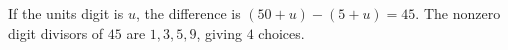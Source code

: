 If the units digit is $u$, the difference is $(50+u)-(5+u)=45$. The nonzero digit divisors of $45$ are $1,3,5,9$, giving $\boxed4$ choices.
